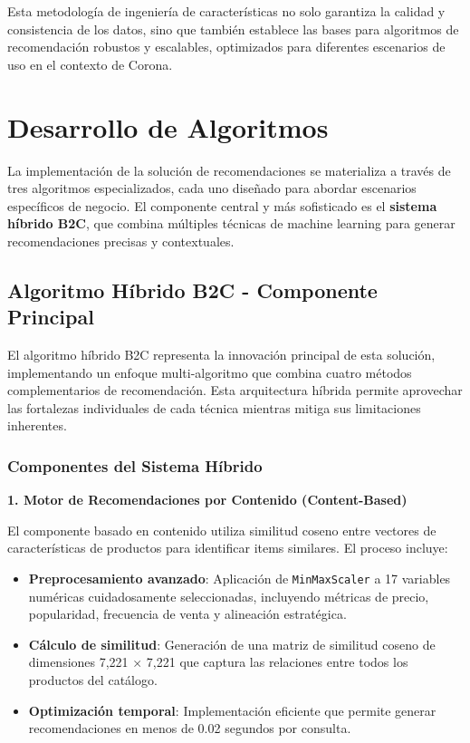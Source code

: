 \documentclass[twocolumn]{article}
\begin{document}
Esta metodología de ingeniería de características no solo garantiza la calidad y consistencia de los datos, sino que también establece las bases para algoritmos de recomendación robustos y escalables, optimizados para diferentes escenarios de uso en el contexto de Corona.

\section{Desarrollo de Algoritmos}

La implementación de la solución de recomendaciones se materializa a través de tres algoritmos especializados, cada uno diseñado para abordar escenarios específicos de negocio. El componente central y más sofisticado es el \textbf{sistema híbrido B2C}, que combina múltiples técnicas de machine learning para generar recomendaciones precisas y contextuales.

\subsection{Algoritmo Híbrido B2C - Componente Principal}

El algoritmo híbrido B2C representa la innovación principal de esta solución, implementando un enfoque multi-algoritmo que combina cuatro métodos complementarios de recomendación. Esta arquitectura híbrida permite aprovechar las fortalezas individuales de cada técnica mientras mitiga sus limitaciones inherentes.

\subsubsection{Componentes del Sistema Híbrido}

\textbf{1. Motor de Recomendaciones por Contenido (Content-Based)}

El componente basado en contenido utiliza similitud coseno entre vectores de características de productos para identificar items similares. El proceso incluye:

\begin{itemize}
    \item \textbf{Preprocesamiento avanzado}: Aplicación de \texttt{MinMaxScaler} a 17 variables numéricas cuidadosamente seleccionadas, incluyendo métricas de precio, popularidad, frecuencia de venta y alineación estratégica.
    \item \textbf{Cálculo de similitud}: Generación de una matriz de similitud coseno de dimensiones 7,221 × 7,221 que captura las relaciones entre todos los productos del catálogo.
    \item \textbf{Optimización temporal}: Implementación eficiente que permite generar recomendaciones en menos de 0.02 segundos por consulta.
\end{itemize}
\end{document}
